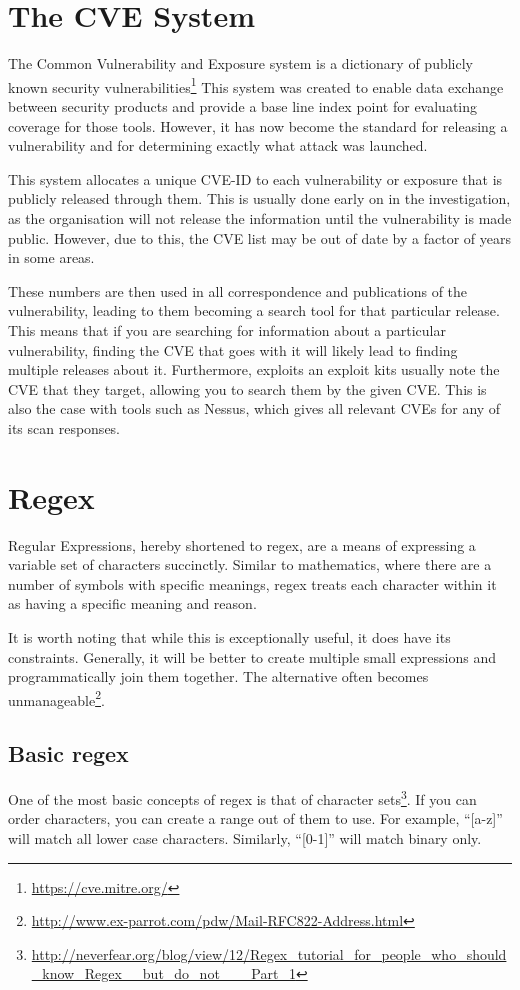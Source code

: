	\section{The CVE System}
		The Common Vulnerability and Exposure system is a dictionary of publicly known security vulnerabilities\footnote{\url{https://cve.mitre.org/}}
		This system was created to enable data exchange between security products and provide a base line index point for evaluating coverage for those tools.
		However, it has now become the standard for releasing a vulnerability and for determining exactly what attack was launched.

		This system allocates a unique CVE-ID to each vulnerability or exposure that is publicly released through them.
		This is usually done early on in the investigation, as the organisation will not release the information until the vulnerability is made public.
		However, due to this, the CVE list may be out of date by a factor of years in some areas.

		These numbers are then used in all correspondence and publications of the vulnerability, leading to them becoming a search tool for that particular release.
		This means that if you are searching for information about a particular vulnerability, finding the CVE that goes with it will likely lead to finding multiple releases about it.
		Furthermore, exploits an exploit kits usually note the CVE that they target, allowing you to search them by the given CVE.
		This is also the case with tools such as Nessus, which gives all relevant CVEs for any of its scan responses.


	\section{Regex}
		Regular Expressions, hereby shortened to regex, are a means of expressing a variable set of characters succinctly.
		Similar to mathematics, where there are a number of symbols with specific meanings,
		regex treats each character within it as having a specific meaning and reason\cite{regexTHW}.

		It is worth noting that while this is exceptionally useful, it does have its constraints.
		Generally, it will be better to create multiple small expressions and programmatically join them together.
		The alternative often becomes unmanageable\footnote{\url{http://www.ex-parrot.com/pdw/Mail-RFC822-Address.html}}.

		\subsection{Basic regex}
			One of the most basic concepts of regex is that of character sets\footnote{\url{http://neverfear.org/blog/view/12/Regex\_tutorial\_for\_people\_who\_should\_know\_Regex\_\_but\_do\_not\_\_\_Part\_1}}.
			If you can order characters, you can create a range out of them to use.
			For example, ``[a-z]'' will match all lower case characters.
			Similarly, ``[0-1]'' will match binary only.

